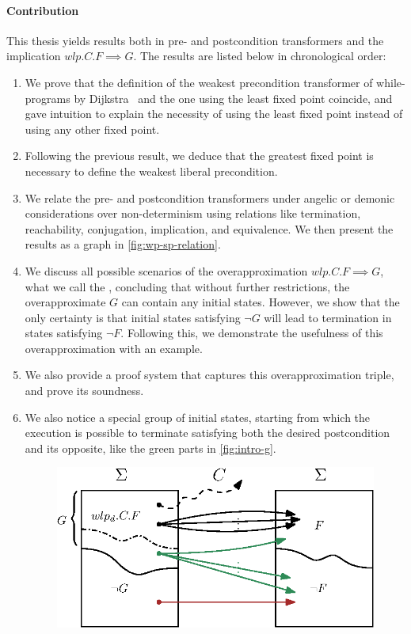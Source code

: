 \paragraph{Contribution}
This thesis yields results both in pre- and postcondition transformers and the implication $wlp.C.F\implies G$. 
The results are listed below in chronological order: 
\begin{enumerate}
    \item We prove that the definition of the weakest precondition transformer of while-programs by Dijkstra~\cite{dijkstra75} and the one using the least fixed point coincide, and gave intuition to explain the necessity of using the least fixed point instead of using any other fixed point. 
    \item Following the previous result, we deduce that the greatest fixed point is necessary to define the weakest liberal precondition. 
    \item We relate the pre- and postcondition transformers under angelic or demonic considerations over non-determinism using relations like termination, reachability, conjugation, implication, and equivalence. 
    We then present the results as a graph in \autoref{fig:wp-sp-relation}.
    \item We discuss all possible scenarios of the overapproximation $wlp.C.F\implies G$, what we call the , concluding that without further restrictions, the overapproximate $G$ can contain any initial states. However, we show that the only certainty is that initial states satisfying $\neg G$ will lead to termination in states satisfying $\neg F$. Following this, we demonstrate the usefulness of this overapproximation with an example. 
    \item We also provide a proof system that captures this overapproximation triple, and prove its soundness. 
    \item We also notice a special group of initial states, starting from which the execution is possible to terminate satisfying both the desired postcondition and its opposite, like the green parts in \autoref{fig:intro-g}. 
    \begin{figure}[t]
        \centering
        \includegraphics[width=.6\linewidth]{image/wlp-g/wlp-g-gg.eps}

\end{figure}
\end{enumerate}
